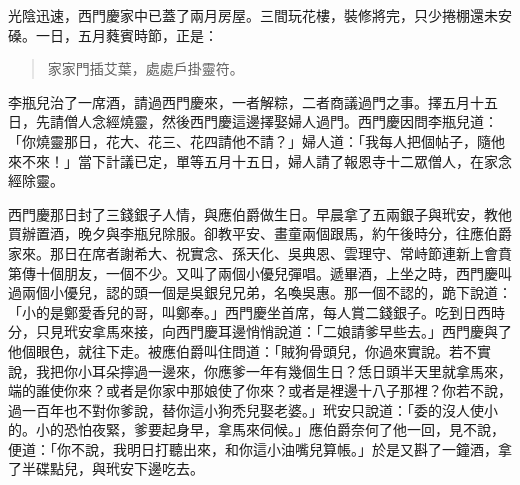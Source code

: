 光陰迅速，西門慶家中已蓋了兩月房屋。三間玩花樓，裝修將完，只少捲棚還未安磉。一日，五月蕤賓時節，正是：
\begin{quote}
家家門插艾葉，處處戶掛靈符。
\end{quote}

李瓶兒治了一席酒，請過西門慶來，一者解粽，二者商議過門之事。擇五月十五日，先請僧人念經燒靈，然後西門慶這邊擇娶婦人過門。西門慶因問李瓶兒道：「你燒靈那日，花大、花三、花四請他不請？」婦人道：「我每人把個帖子，隨他來不來！」當下計議已定，單等五月十五日，婦人請了報恩寺十二眾僧人，在家念經除靈。

西門慶那日封了三錢銀子人情，與應伯爵做生日。早晨拿了五兩銀子與玳安，教他買辦置酒，晚夕與李瓶兒除服。卻教平安、畫童兩個跟馬，約午後時分，往應伯爵家來。那日在席者謝希大、祝實念、孫天化、吳典恩、雲理守、常峙節連新上會賁第傳十個朋友，一個不少。又叫了兩個小優兒彈唱。遞畢酒，上坐之時，西門慶叫過兩個小優兒，認的頭一個是吳銀兒兄弟，名喚吳惠。那一個不認的，跪下說道：「小的是鄭愛香兒的哥，叫鄭奉。」西門慶坐首席，每人賞二錢銀子。吃到日西時分，只見玳安拿馬來接，向西門慶耳邊悄悄說道：「二娘請爹早些去。」西門慶與了他個眼色，就往下走。被應伯爵叫住問道：「賊狗骨頭兒，你過來實說。若不實說，我把你小耳朵擰過一邊來，你應爹一年有幾個生日？恁日頭半天里就拿馬來，端的誰使你來？或者是你家中那娘使了你來？或者是裡邊十八子那裡？你若不說，過一百年也不對你爹說，替你這小狗禿兒娶老婆。」玳安只說道：「委的沒人使小的。小的恐怕夜緊，爹要起身早，拿馬來伺候。」應伯爵奈何了他一回，見不說，便道：「你不說，我明日打聽出來，和你這小油嘴兒算帳。」於是又斟了一鐘酒，拿了半碟點兒，與玳安下邊吃去。

